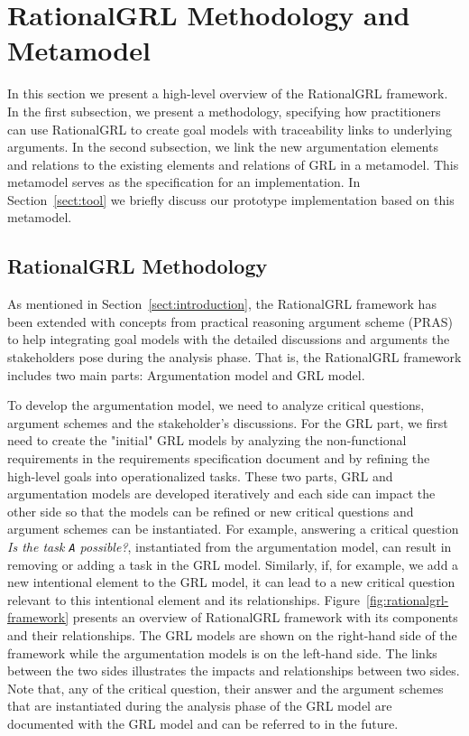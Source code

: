 \section{RationalGRL Methodology and Metamodel}
\label{sect:overview}

In this section we present a high-level overview of the RationalGRL framework. In the first subsection, we present a methodology, specifying how practitioners can use RationalGRL to create goal models with traceability links to underlying arguments. In the second subsection, we link the new argumentation elements and relations to the existing elements and relations of GRL in a metamodel. This metamodel serves as the specification for an implementation. In Section~\ref{sect:tool} we briefly discuss our prototype implementation based on this metamodel.

\subsection{RationalGRL Methodology} 

As mentioned in Section~\ref{sect:introduction}, the RationalGRL framework has been extended with concepts from practical reasoning argument scheme (PRAS) to help integrating goal models with the detailed discussions and arguments the stakeholders pose during the analysis phase. That is, the RationalGRL framework includes two main parts: Argumentation model and GRL model. 

To develop the argumentation model, we need to analyze critical questions, argument schemes and the stakeholder's discussions. For the GRL part, we first need to create the "initial" GRL models by analyzing the non-functional requirements in the requirements specification document and by refining the high-level goals into operationalized tasks. These two parts, GRL and argumentation models are developed iteratively and each side can impact the other side so that the models can be refined or new critical questions and argument schemes can be instantiated. For example, answering a critical question \emph{Is the task \texttt{A} possible?}, instantiated from the argumentation model, can result in removing or adding a task in the GRL model. Similarly,  if, for example, we add a new intentional element to the GRL model, it can lead to a new critical question relevant to this intentional element and its relationships.  Figure~\ref{fig:rationalgrl-framework} presents an overview of RationalGRL framework with its components and their relationships.  The GRL models  are shown  on the right-hand side of the framework while the argumentation models is on the left-hand side. The links between the two sides illustrates the impacts and relationships between two sides. Note that, any of the critical question, their answer and the argument schemes that are instantiated during the analysis phase of the GRL model are documented with the GRL model and can be referred to in the future. 

